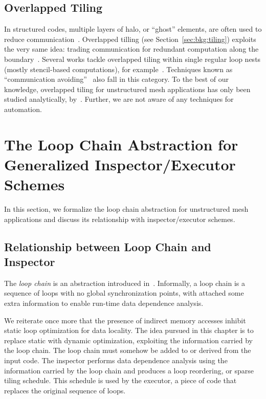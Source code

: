\subsection*{Overlapped Tiling}
In structured codes, multiple layers of halo, or ``ghost'' elements, are often used to reduce communication~\citep{Bassetti98}. Overlapped tilling (see Section~\ref{sec:bkg:tiling}) exploits the very same idea: trading communication for redundant computation along the boundary~\citep{Zhou12}. Several works tackle overlapped tiling within single regular loop nests (mostly stencil-based computations), for example~\cite{Meng09,Krishnamoorthy07,Chen02}. Techniques known as ``communication avoiding''~\citep{ST-Demmel08,ST-commAvoidingSparse2009} also fall in this category. To the best of our knowledge, overlapped tiling for unstructured mesh applications has only been studied analytically, by~\cite{gihan-overlapped}. Further, we are not aware of any techniques for automation.



\section{The Loop Chain Abstraction for Generalized Inspector/Executor Schemes}
\label{sec:tiling:lc}
In this section, we formalize the loop chain abstraction for unstructured mesh applications and discuss its relationship with inspector/executor schemes.

\subsection{Relationship between Loop Chain and Inspector}
The \textit{loop chain} is an abstraction introduced in~\cite{ST-KriegerHIPS2013}. Informally, a loop chain is a sequence of loops with no global synchronization points, with attached some extra information to enable run-time data dependence analysis. 

We reiterate once more that the presence of indirect memory accesses inhibit static loop optimization for data locality. The idea pursued in this chapter is to replace static with dynamic optimization, exploiting the information carried by the loop chain. The loop chain must somehow be added to or derived from the input code. The inspector performs data dependence analysis using the information carried by the loop chain and produces a loop reordering, or sparse tiling schedule. This schedule is used by the executor, a piece of code that replaces the original sequence of loops.

